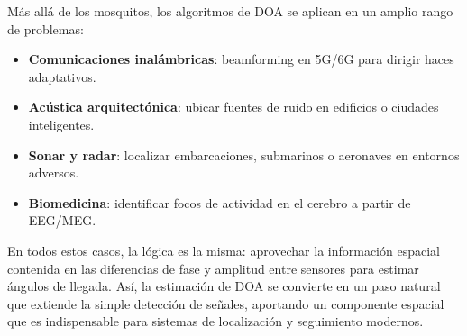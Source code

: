 Más allá de los mosquitos, los algoritmos de DOA se aplican en un amplio rango de problemas:  
\begin{itemize}
	\item \textbf{Comunicaciones inalámbricas}: beamforming en 5G/6G para dirigir haces adaptativos.  
	\item \textbf{Acústica arquitectónica}: ubicar fuentes de ruido en edificios o ciudades inteligentes.  
	\item \textbf{Sonar y radar}: localizar embarcaciones, submarinos o aeronaves en entornos adversos.  
	\item \textbf{Biomedicina}: identificar focos de actividad en el cerebro a partir de EEG/MEG.  
\end{itemize}

En todos estos casos, la lógica es la misma: aprovechar la información espacial contenida en las diferencias 
de fase y amplitud entre sensores para estimar ángulos de llegada.  
Así, la estimación de DOA se convierte en un paso natural que extiende la simple detección de señales, 
aportando un componente espacial que es indispensable para sistemas de localización y seguimiento modernos.


